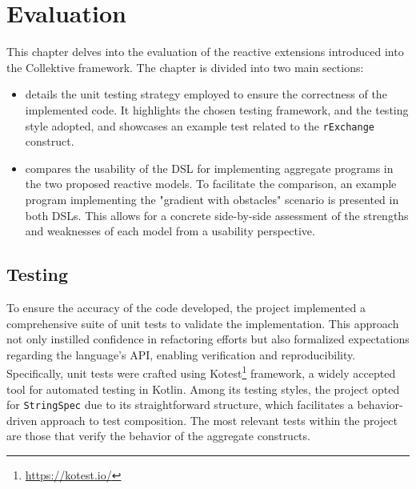 
\chapter{Evaluation}
\label{chap:evaluation}

This chapter delves into the evaluation of the reactive extensions introduced into the Collektive framework. The chapter is divided into two main sections:

\begin{itemize}
    \item {} details the unit testing strategy employed to ensure the correctness of the implemented code. It highlights the chosen testing framework, and the testing style adopted, and showcases an example test related to the \texttt{rExchange} construct.
    \item {} compares the usability of the DSL for implementing aggregate programs in the two proposed reactive models. To facilitate the comparison, an example program implementing the "gradient with obstacles" scenario is presented in both DSLs. This allows for a concrete side-by-side assessment of the strengths and weaknesses of each model from a usability perspective.
\end{itemize}

\section{Testing}
\label{section:testing}

To ensure the accuracy of the code developed, the project implemented a comprehensive suite of unit tests to validate the implementation. This approach not only instilled confidence in refactoring efforts but also formalized expectations regarding the language's API, enabling verification and reproducibility. Specifically, unit tests were crafted using Kotest\footnote{\url{https://kotest.io/}} framework, a widely accepted tool for automated testing in Kotlin. Among its testing styles, the project opted for \texttt{StringSpec} due to its straightforward structure, which facilitates a behavior-driven approach to test composition. The most relevant tests within the project are those that verify the behavior of the aggregate constructs.

